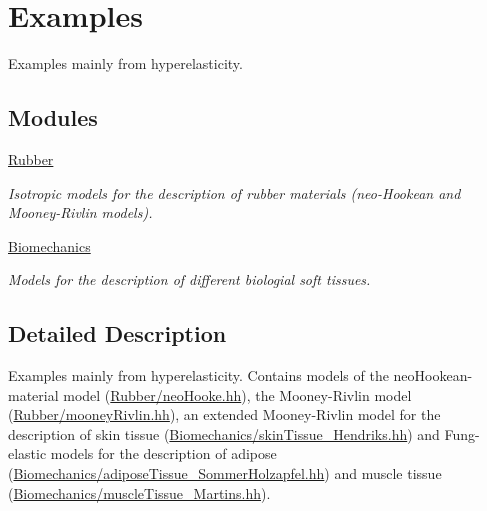 \hypertarget{group__Examples}{\section{Examples}
\label{group__Examples}
}


Examples mainly from hyperelasticity.  


\subsection*{Modules}
\begin{DoxyCompactItemize}
\item 
\hyperlink{group__Rubber}{Rubber}
\begin{DoxyCompactList}\small\item\em Isotropic models for the description of rubber materials (neo-\/\-Hookean and Mooney-\/\-Rivlin models). \end{DoxyCompactList}\item 
\hyperlink{group__Biomechanics}{Biomechanics}
\begin{DoxyCompactList}\small\item\em Models for the description of different biologial soft tissues. \end{DoxyCompactList}\end{DoxyCompactItemize}


\subsection{Detailed Description}
Examples mainly from hyperelasticity. Contains models of the neo\-Hookean-\/material model (\hyperlink{neoHooke_8hh}{Rubber/neo\-Hooke.\-hh}), the Mooney-\/\-Rivlin model (\hyperlink{mooneyRivlin_8hh}{Rubber/mooney\-Rivlin.\-hh}), an extended Mooney-\/\-Rivlin model for the description of skin tissue (\hyperlink{skinTissue__Hendriks_8hh}{Biomechanics/skin\-Tissue\-\_\-\-Hendriks.\-hh}) and Fung-\/elastic models for the description of adipose (\hyperlink{adiposeTissue__SommerHolzapfel_8hh}{Biomechanics/adipose\-Tissue\-\_\-\-Sommer\-Holzapfel.\-hh}) and muscle tissue (\hyperlink{muscleTissue__Martins_8hh}{Biomechanics/muscle\-Tissue\-\_\-\-Martins.\-hh}). 